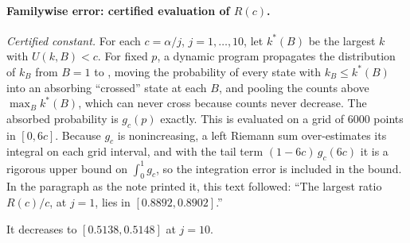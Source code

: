 \paragraph{Familywise error: certified evaluation of $R(c)$.} \emph{Certified constant.}  For each $c=\alpha/j$, $j=1,\dots,10$, let $k^{*}(B)$ be the largest $k$ with $U(k,B)<c$.  For fixed $p$, a dynamic program propagates the distribution of $k_{B}$ from $B=1$ to \jtBcap{}, moving the probability of every state with $k_{B}\le k^{*}(B)$ into an absorbing ``crossed'' state at each $B$, and pooling the counts above $\max_{B}k^{*}(B)$, which can never cross because counts never decrease. The absorbed probability is $g_{c}(p)$ exactly. This is evaluated on a grid of 6000 points in $[0,6c]$.  Because $g_{c}$ is nonincreasing, a left Riemann sum over-estimates its integral on each grid interval, and with the tail term $(1-6c)\,g_{c}(6c)$ it is a rigorous upper bound on $\int_{0}^{1}g_{c}$, so the integration error is included in the bound. In the paragraph as the note printed it, this text followed: ``The largest ratio $R(c)/c$, at $j=1$, lies in $[0.8892,0.8902]$.''\par It decreases to $[0.5138,0.5148]$ at $j=10$.

